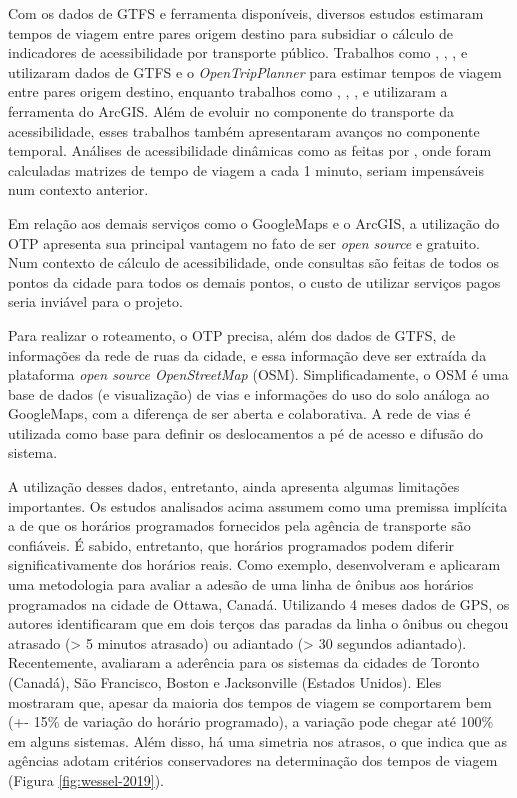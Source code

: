 \documentclass[        
    a4paper,          %
    12pt,             %
    chapter=TITLE,    %
    section=Title,    %
    subsection=Title, %
    oneside,          %
    english,          %
    spanish,          %
    brazil,           %
    fleqn             %
]{abntex2}
\begin{document}
  Com os dados de GTFS e ferramenta disponíveis, diversos estudos estimaram tempos de viagem entre pares origem destino para subsidiar o cálculo de indicadores de acessibilidade por transporte público. Trabalhos como \citet{Owen2015}, \citet{El-Geneidy2016a}, \citet{Wessel2017}, \citet{Mayaud2018} e \citet{Pereira2019} utilizaram dados de GTFS e o \emph{OpenTripPlanner} para estimar tempos de viagem entre pares origem destino, enquanto trabalhos como \citet{Mavoa2012}, \citet{Benenson2010}, \citet{Farber2014}, \citet{Farber2017} e \citet{Stepniak2019} utilizaram a ferramenta do ArcGIS. Além de evoluir no componente do transporte da acessibilidade, esses trabalhos também apresentaram avanços no componente temporal. Análises de acessibilidade dinâmicas como as feitas por \citet{Owen2015}, onde foram calculadas matrizes de tempo de viagem a cada 1 minuto, seriam impensáveis num contexto anterior.
  
  Em relação aos demais serviços como o GoogleMaps e o ArcGIS, a utilização do OTP apresenta sua principal vantagem no fato de ser \emph{open source} e gratuito. Num contexto de cálculo de acessibilidade, onde consultas são feitas de todos os pontos da cidade para todos os demais pontos, o custo de utilizar serviços pagos seria inviável para o projeto.
  
  Para realizar o roteamento, o OTP precisa, além dos dados de GTFS, de informações da rede de ruas da cidade, e essa informação deve ser extraída da plataforma \emph{open source OpenStreetMap} (OSM). Simplificadamente, o OSM é uma base de dados (e visualização) de vias e informações do uso do solo análoga ao GoogleMaps, com a diferença de ser aberta e colaborativa. A rede de vias é utilizada como base para definir os deslocamentos a pé de acesso e difusão do sistema.
  
  A utilização desses dados, entretanto, ainda apresenta algumas limitações importantes. Os estudos analisados acima assumem como uma premissa implícita a de que os horários programados fornecidos pela agência de transporte são confiáveis. É sabido, entretanto, que horários programados podem diferir significativamente dos horários reais. Como exemplo, \citet{Mandelzys2010} desenvolveram e aplicaram uma metodologia para avaliar a adesão de uma linha de ônibus aos horários programados na cidade de Ottawa, Canadá. Utilizando 4 meses dados de GPS, os autores identificaram que em dois terços das paradas da linha o ônibus ou chegou atrasado (\textgreater{} 5 minutos atrasado) ou adiantado (\textgreater{} 30 segundos adiantado). Recentemente, \citet{Wessel2019a} avaliaram a aderência para os sistemas da cidades de Toronto (Canadá), São Francisco, Boston e Jacksonville (Estados Unidos). Eles mostraram que, apesar da maioria dos tempos de viagem se comportarem bem (+- 15\% de variação do horário programado), a variação pode chegar até 100\% em alguns sistemas. Além disso, há uma simetria nos atrasos, o que indica que as agências adotam critérios conservadores na determinação dos tempos de viagem (Figura \ref{fig:wessel-2019}).
  
\end{document}
